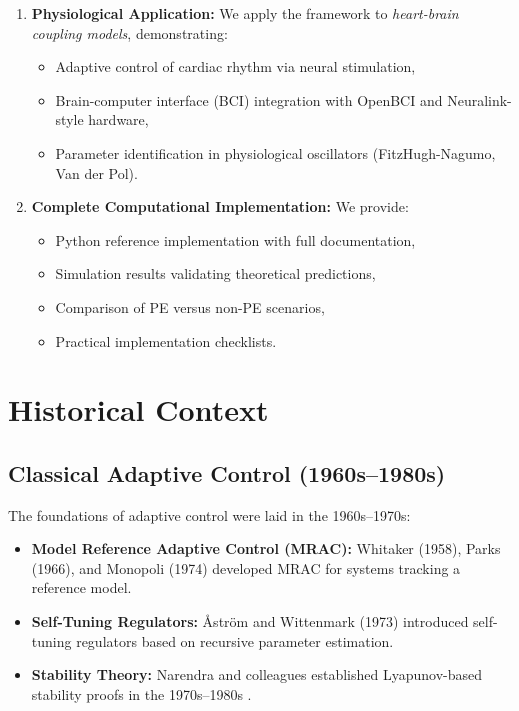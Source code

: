 \begin{enumerate}
    \item \textbf{Physiological Application:} We apply the framework to \textit{heart-brain coupling models}, demonstrating:
    \begin{itemize}
        \item Adaptive control of cardiac rhythm via neural stimulation,
        \item Brain-computer interface (BCI) integration with OpenBCI and Neuralink-style hardware,
        \item Parameter identification in physiological oscillators (FitzHugh-Nagumo, Van der Pol).
    \end{itemize}

    \item \textbf{Complete Computational Implementation:} We provide:
    \begin{itemize}
        \item Python reference implementation with full documentation,
        \item Simulation results validating theoretical predictions,
        \item Comparison of PE versus non-PE scenarios,
        \item Practical implementation checklists.
    \end{itemize}
\end{enumerate}

\section{Historical Context}

\subsection{Classical Adaptive Control (1960s--1980s)}

The foundations of adaptive control were laid in the 1960s--1970s:
\begin{itemize}
    \item \textbf{Model Reference Adaptive Control (MRAC):} Whitaker (1958), Parks (1966), and Monopoli (1974) developed MRAC for systems tracking a reference model.
    \item \textbf{Self-Tuning Regulators:} Åström and Wittenmark (1973) introduced self-tuning regulators based on recursive parameter estimation.
    \item \textbf{Stability Theory:} Narendra and colleagues established Lyapunov-based stability proofs in the 1970s--1980s \cite{Narendra1989}.
\end{itemize}

